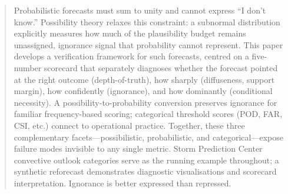
\begin{abstract}
Probabilistic forecasts must sum to unity and cannot
express ``I don't know.''
Possibility theory relaxes this constraint:
a subnormal distribution explicitly measures how much of
the plausibility budget remains unassigned, ignorance
signal that probability cannot represent.
This paper develops a verification framework for such
forecasts, centred on a five-number scorecard that
separately diagnoses whether the forecast pointed at
the right outcome (depth-of-truth), how sharply
(diffuseness, support margin), how confidently
(ignorance), and how dominantly (conditional necessity).
A possibility-to-probability conversion preserves
ignorance for familiar frequency-based scoring;
categorical threshold scores (POD, FAR, CSI, etc.)
connect to operational practice.
Together, these three complementary
facets---possibilistic, probabilistic, and
categorical---expose failure modes invisible to any
single metric.
Storm Prediction Center convective outlook categories
serve as the running example throughout;
a synthetic reforecast demonstrates diagnostic
visualisations and scorecard interpretation.
Ignorance is better expressed than repressed.
\end{abstract}

